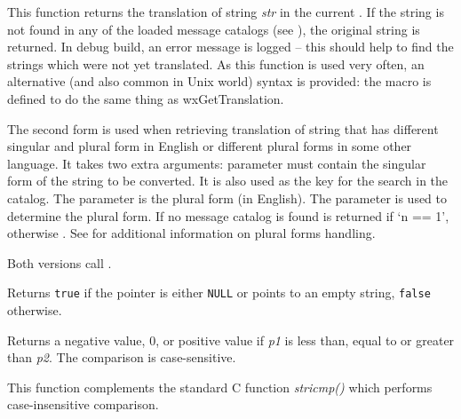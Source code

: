 
This function returns the translation of string {\it str} in the current
. If the string is not found in any of the loaded
message catalogs (see ), the
original string is returned. In debug build, an error message is logged -- this
should help to find the strings which were not yet translated. As this function
is used very often, an alternative (and also common in Unix world) syntax is
provided: the  macro is defined to do the same thing
as wxGetTranslation.

The second form is used when retrieving translation of string that has
different singular and plural form in English or different plural forms in some
other language. It takes two extra arguments: 
parameter must contain the singular form of the string to be converted.
It is also used as the key for the search in the catalog.
The  parameter is the plural form (in English).
The parameter  is used to determine the plural form.  If no
message catalog is found  is returned if `n == 1',
otherwise .
See  for additional information on plural forms handling.

Both versions call .

\label{wxisempty}


Returns {\tt true} if the pointer is either {\tt NULL} or points to an empty
string, {\tt false} otherwise.


\label{wxstrcmp}


Returns a negative value, 0, or positive value if {\it p1} is less than, equal
to or greater than {\it p2}. The comparison is case-sensitive.

This function complements the standard C function {\it stricmp()} which performs
case-insensitive comparison.


\label{wxstricmp}



